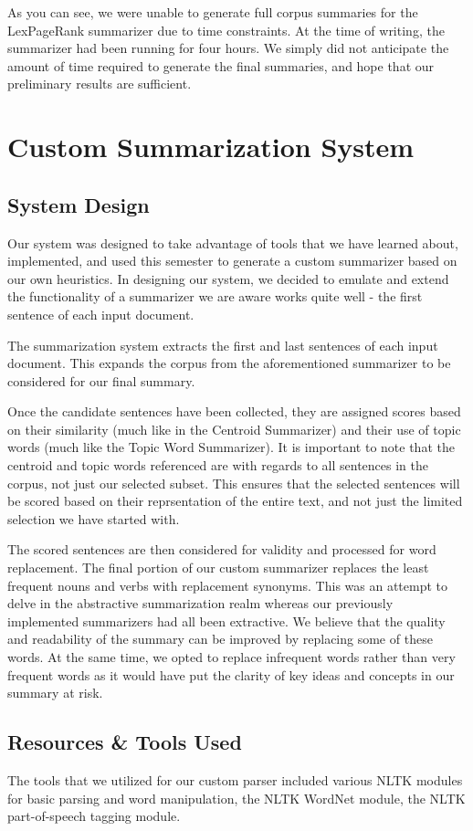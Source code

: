 \documentclass[11pt,letterpaper]{article}
\begin{document}
As you can see, we were unable to generate full corpus summaries for the LexPageRank summarizer due to time constraints. At the time of writing, the summarizer had been running for four hours. We simply did not anticipate the amount of time required to generate the final summaries, and hope that our preliminary results are sufficient.

\section{Custom Summarization System}
\subsection{System Design}
Our system was designed to take advantage of tools that we have learned about, implemented, and used this semester to generate a custom summarizer based on our own heuristics. In designing our system, we decided to emulate and extend the functionality of a summarizer we are aware works quite well - the first sentence of each input document.

The summarization system extracts the first and last sentences of each input document. This expands the corpus from the aforementioned summarizer to be considered for our final summary.

Once the candidate sentences have been collected, they are assigned scores based on their similarity (much like in the Centroid Summarizer) and their use of topic words (much like the Topic Word Summarizer). It is important to note that the centroid and topic words referenced are with regards to all sentences in the corpus, not just our selected subset. This ensures that the selected sentences will be scored based on their reprsentation of the entire text, and not just the limited selection we have started with.

The scored sentences are then considered for validity and processed for word replacement. The final portion of our custom summarizer replaces the least frequent nouns and verbs with replacement synonyms. This was an attempt to delve in the abstractive summarization realm whereas our previously implemented summarizers had all been extractive. We believe that the quality and readability of the summary can be improved by replacing some of these words. At the same time, we opted to replace infrequent words rather than very frequent words as it would have put the clarity of key ideas and concepts in our summary at risk.

\subsection{Resources \& Tools Used}
The tools that we utilized for our custom parser included various NLTK modules for basic parsing and word manipulation, the NLTK WordNet module, the NLTK part-of-speech tagging module.
\end{document}
